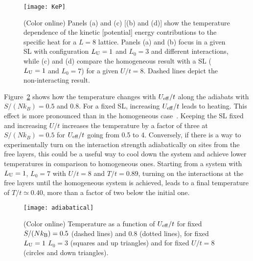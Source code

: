 \documentclass[aps,pra,reprint,twocolumn,showpacs,longbibliography,superscriptaddress]{revtex4-1}
\begin{document}
\begin{figure}[!tb] %
  \texttt{[image: KeP]}
 \caption{(Color online) Panels (a) and (c) [(b) and (d)] show the temperature dependence of the kinetic [potential] energy contributions to the specific heat for a $L=8$ lattice. Panels (a) and (b) focus in a given SL with configuration $L_{\rm U} = 1$ and $L_0=3$ and different interactions, while (c) and (d) compare the homogeneous result with a SL ($L_{\rm U}=1$ and $L_0=7$) for a given $U/t=8$. Dashed lines depict the non-interacting result.}
 \label{fig:KeP}
\end{figure}

Figure~\ref{fig:adiabatical} shows how the temperature changes with $U_{\rm eff}/t$ along the adiabats with $S/(Nk_B)=0.5$ and 0.8. For a fixed SL, increasing $U_{\rm eff}/t$ leads to heating. This effect is more pronounced than in the homogeneous case~\cite{tspin}. Keeping the SL fixed and increasing $U/t$ increases the temperature by a factor of three at $S/(Nk_B)=0.5$ for $U_{\rm eff}/t$ going from 0.5
to 4.  Conversely,  if there is a way to experimentally turn on the interaction strength adiabatically on sites from the free layers, this could be a useful way to cool down the system and achieve lower temperatures in comparison to homogeneous ones.  Starting from a system with $L_{\rm U}=1$,  $L_0=7$ with $U/t=8$ and $T/t=0.89$, turning on the interactions at the free layers until the homogeneous system is achieved, leads to a final temperature of $T/t\simeq0.40$, more than a factor of two below the initial one.


\begin{figure}[!tb] %
  \texttt{[image: adiabatical]}
 \caption{(Color online) Temperature as a function of $U_{\rm eff}/t$ for fixed $S/(Nk_{\rm B})=0.5$ (dashed lines) and 0.8 (dotted lines), for fixed $L_{\rm U}=1$ $L_0=3$ (squares and up triangles) and for fixed $U/t=8$ (circles and down triangles).}
 \label{fig:adiabatical}
\end{figure}

\end{document}
